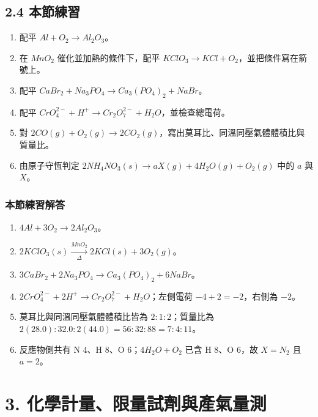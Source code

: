 \documentclass[11pt,a4paper]{article}
\providecommand{\tightlist}{%
  \setlength{\itemsep}{0pt}\setlength{\parskip}{0pt}}
\begin{document}
\subsection{2.4 本節練習}\label{ux672cux7bc0ux7df4ux7fd2-1}

\begin{enumerate}
\def\labelenumi{\arabic{enumi}.}
\tightlist
\item
  配平 \(Al+O_2\rightarrow Al_2O_3\)。
\item
  在 \(MnO_2\) 催化並加熱的條件下，配平 \(KClO_3\rightarrow KCl+O_2\)，並把條件寫在箭號上。
\item
  配平 \(CaBr_2+Na_3PO_4\rightarrow Ca_3(PO_4)_2+NaBr\)。
\item
  配平 \(CrO_4^{2-}+H^+\rightarrow Cr_2O_7^{2-}+H_2O\)，並檢查總電荷。
\item
  對 \(2CO(g)+O_2(g)\rightarrow2CO_2(g)\)，寫出莫耳比、同溫同壓氣體體積比與質量比。
\item
  由原子守恆判定 \(2NH_4NO_3(s)\rightarrow aX(g)+4H_2O(g)+O_2(g)\) 中的 \(a\) 與 \(X\)。
\end{enumerate}

\subsubsection{本節練習解答}\label{ux672cux7bc0ux7df4ux7fd2ux89e3ux7b54-1}

\begin{enumerate}
\def\labelenumi{\arabic{enumi}.}
\tightlist
\item
  \(\boxed{4Al+3O_2\rightarrow2Al_2O_3}\)。
\item
  \(\boxed{2KClO_3(s)\xrightarrow[\Delta]{MnO_2}2KCl(s)+3O_2(g)}\)。
\item
  \(\boxed{3CaBr_2+2Na_3PO_4\rightarrow Ca_3(PO_4)_2+6NaBr}\)。
\item
  \(\boxed{2CrO_4^{2-}+2H^+\rightarrow Cr_2O_7^{2-}+H_2O}\)；左側電荷 \(-4+2=-2\)，右側為 \(-2\)。
\item
  莫耳比與同溫同壓氣體體積比皆為 \(2:1:2\)；質量比為 \(2(28.0):32.0:2(44.0)=56:32:88=7:4:11\)。
\item
  反應物側共有 N 4、H 8、O 6；\(4H_2O+O_2\) 已含 H 8、O 6，故 \(X=N_2\) 且 \(a=2\)。
\end{enumerate}

\clearpage

\section{3. 化學計量、限量試劑與產氣量測}\label{ux5316ux5b78ux8a08ux91cfux9650ux91cfux8a66ux5291ux8207ux7522ux6c23ux91cfux6e2c}
\end{document}
